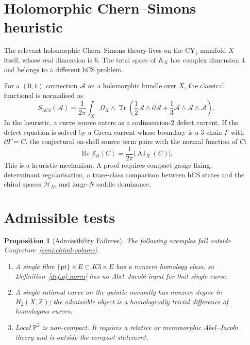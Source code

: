 \documentclass[11pt]{article}
\newtheorem{proposition}[theorem]{Proposition}
\newcommand{\cH}{\mathcal{H}}
\newcommand{\bZ}{\mathbb{Z}}
\newcommand{\AJ}{\operatorname{AJ}}
\newcommand{\Tr}{\operatorname{Tr}}
\begin{document}
\section{Holomorphic Chern--Simons heuristic}
\label{sec:hcs}

The relevant holomorphic Chern--Simons theory lives on the CY$_3$
manifold $X$ itself, whose real dimension is $6$. The total space of
\(K_X\) has complex dimension \(4\) and belongs to a different hCS
problem.

For a $(0,1)$ connection $\mathcal A$ on a holomorphic bundle over $X$,
the classical functional is normalised as
\[
  S_{\mathrm{hCS}}(\mathcal A)
  =
  \frac{1}{2\pi}
  \int_X \Omega_X\wedge
  \Tr\left(
    \frac{1}{2}\mathcal A\wedge\bar\partial\mathcal A
    +
    \frac{1}{3}\mathcal A\wedge\mathcal A\wedge\mathcal A
  \right).
\]
In the heuristic, a curve source enters as a codimension-$2$ defect
current. If the defect equation is solved by a Green current whose
boundary is a 3-chain $\Gamma$ with $\partial\Gamma=C$, the conjectural
on-shell source term pairs with the normal function of $C$:
\[
  \operatorname{Re} S_{\mathrm{cl}}(C)
  =
  \frac{1}{2\pi}|\AJ_X(C)|.
\]
This is a heuristic mechanism. A proof requires compact gauge fixing,
determinant regularisation, a trace-class comparison between hCS states
and the chiral spaces $\cH_N$, and large-$N$ saddle dominance.

\section{Admissible tests}
\label{sec:tests}

\begin{proposition}[Admissibility Failures]
\label{prop:admissibility-failures}
The following examples fall outside Conjecture~\ref{conj:chiral-volume}.
\begin{enumerate}[label=\textup{(\roman*)}]
\item A single fibre $\{\mathrm{pt}\}\times E\subset K3\times E$ has a
  nonzero homology class, so Definition~\ref{def:aj-norm} has no
  Abel--Jacobi input for that single curve.
\item A single rational curve on the quintic normally has nonzero
  degree in $H_2(X,\bZ)$; the admissible object is a homologically
  trivial difference of homologous curves.
\item Local $\mathbb P^2$ is non-compact. It requires a relative or
  meromorphic Abel--Jacobi theory and is outside the compact statement.
\end{enumerate}
\end{proposition}
\end{document}
